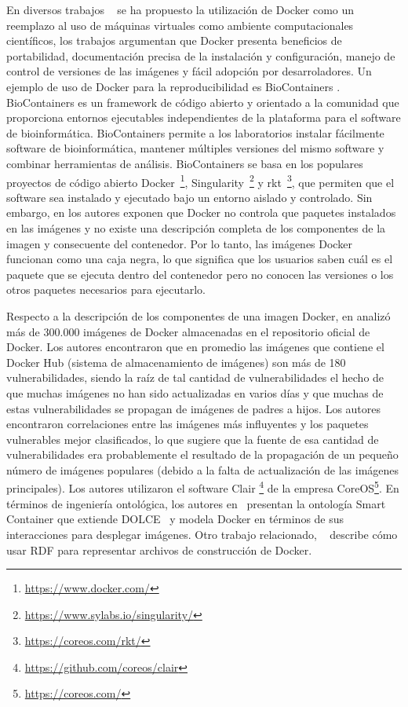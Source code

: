 En diversos trabajos ~\cite{DBLP:journals/bioinformatics/LeprevostGARUBV17, Beaulieu2017, Boettiger:2015:IDR:2723872.2723882, aranguren2015enhanced} se ha propuesto la utilización de Docker como un reemplazo al uso de máquinas virtuales como ambiente computacionales científicos, los trabajos argumentan que Docker presenta beneficios de portabilidad, documentación precisa de la instalación y configuración, manejo de control de versiones de las imágenes y fácil adopción por desarroladores. 
Un ejemplo de uso de Docker para la reproducibilidad es BioContainers \cite{DBLP:journals/bioinformatics/LeprevostGARUBV17}. BioContainers es un framework de código abierto y orientado a la comunidad que proporciona entornos ejecutables independientes de la plataforma para el software de bioinformática. BioContainers permite a los laboratorios instalar fácilmente software de bioinformática, mantener múltiples versiones del mismo software y combinar herramientas de análisis. BioContainers se basa en los populares proyectos de código abierto Docker~\footnote{\url{https://www.docker.com/}}, Singularity~\footnote{\url{https://www.sylabs.io/singularity/}} y rkt~\footnote{\url{https://coreos.com/rkt/}}, que permiten que el software sea instalado y ejecutado bajo un entorno aislado y controlado.
Sin embargo, en \cite{Boettiger:2015:IDR:2723872.2723882,DBLP:conf/semweb/OsorioAV18} los autores exponen que Docker no controla que paquetes instalados en las imágenes y no existe una descripción completa de los componentes de la imagen y consecuente del contenedor. Por lo tanto, las imágenes Docker funcionan como una caja negra, lo que significa que los usuarios saben cuál es el paquete que se ejecuta dentro del contenedor pero no conocen las versiones o los otros paquetes necesarios para ejecutarlo.

Respecto a la descripción de los componentes de una imagen Docker, en \cite{Shu:2017:SSV:3029806.3029832:DockerHub:Security} analizó más de 300.000 imágenes de Docker almacenadas en el repositorio oficial de Docker. Los autores encontraron que en promedio las imágenes que contiene el Docker Hub (sistema de almacenamiento de imágenes) son más de 180 vulnerabilidades, siendo la raíz de tal cantidad de vulnerabilidades el hecho de que muchas imágenes no han sido actualizadas en varios días y que muchas de estas vulnerabilidades se propagan de imágenes de padres a hijos. Los autores encontraron correlaciones entre las imágenes más influyentes y los paquetes vulnerables mejor clasificados, lo que sugiere que la fuente de esa cantidad de vulnerabilidades era probablemente el resultado de la propagación de un pequeño número de imágenes populares (debido a la falta de actualización de las imágenes principales). Los autores utilizaron el software Clair \footnote{\url{https://github.com/coreos/clair}} de la empresa CoreOS\footnote{\url{https://coreos.com/}}. 
En términos de ingeniería ontológica, los autores en~\cite{huo2015smart} presentan la ontología Smart Container que extiende DOLCE~\cite{gangemi2002sweetening} y modela Docker en términos de sus interacciones para desplegar imágenes. Otro trabajo relacionado, ~\cite{tommasini2017representing}  describe cómo usar RDF para representar archivos de construcción de Docker. 

